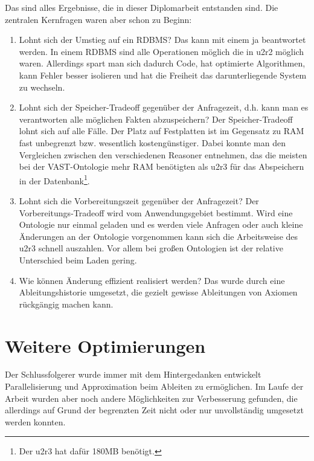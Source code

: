 Das sind alles Ergebnisse, die in dieser Diplomarbeit entstanden sind. Die zentralen Kernfragen waren aber schon zu Beginn:
\begin{enumerate}
  \item Lohnt sich der Umstieg auf ein RDBMS? Das kann mit einem ja beantwortet werden. In einem RDBMS sind alle Operationen möglich die in u2r2 möglich waren. Allerdings spart man sich dadurch Code, hat optimierte Algorithmen, kann Fehler besser isolieren und hat die Freiheit das darunterliegende System zu wechseln.
  \item Lohnt sich der Speicher-Tradeoff gegenüber der Anfragezeit, d.h. kann man es verantworten alle möglichen Fakten abzuspeichern? Der Speicher-Tradeoff lohnt sich auf alle Fälle. Der Platz auf Festplatten ist im Gegensatz zu RAM fast unbegrenzt bzw. wesentlich kostengünstiger. Dabei konnte man den Vergleichen zwischen den verschiedenen Reasoner entnehmen, das die meisten bei der VAST-Ontologie mehr RAM benötigten als u2r3 für das Abspeichern in der Datenbank\footnote{Der u2r3 hat dafür 180MB benötigt.}.
  \item Lohnt sich die Vorbereitungszeit gegenüber der Anfragezeit? Der Vorbereitungs-Tradeoff wird vom Anwendungsgebiet bestimmt. Wird eine Ontologie nur einmal geladen und es werden viele Anfragen oder auch kleine Änderungen an der Ontologie vorgenommen kann sich die Arbeitsweise des u2r3 schnell auszahlen. Vor allem bei großen Ontologien ist der relative Unterschied beim Laden gering.
  \item Wie können Änderung effizient realisiert werden? Das wurde durch eine Ableitungshistorie umgesetzt, die gezielt gewisse Ableitungen von Axiomen rückgängig machen kann.
\end{enumerate}

\section{Weitere Optimierungen}
\label{abschnitt-weitere-optimierungen}
Der Schlussfolgerer wurde immer mit dem  Hintergedanken entwickelt Parallelisierung und Approximation beim Ableiten zu ermöglichen. Im Laufe der Arbeit wurden aber noch andere Möglichkeiten zur Verbesserung gefunden, die allerdings auf Grund der begrenzten Zeit nicht oder nur unvollständig umgesetzt werden konnten.

